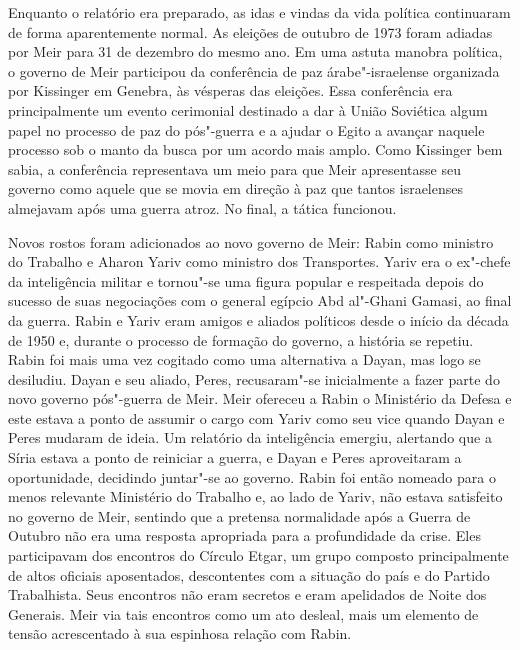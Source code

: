 
Enquanto o relatório era preparado, as idas e vindas da vida
política continuaram de forma aparentemente normal. As eleições de
outubro de 1973 foram adiadas por Meir para 31 de dezembro do mesmo ano.
Em uma astuta manobra política, o governo de Meir participou da
conferência de paz árabe"-israelense organizada por Kissinger em Genebra,
às vésperas das eleições. Essa conferência era principalmente
um evento cerimonial destinado a dar à União Soviética algum papel no
processo de paz do pós"-guerra e a ajudar o Egito a avançar naquele
processo sob o manto da busca por um acordo mais amplo. Como Kissinger
bem sabia, a conferência representava um meio para que Meir apresentasse
seu governo como aquele que se movia em direção à paz que tantos
israelenses almejavam após uma guerra atroz. No final, a tática
funcionou.

Novos rostos foram adicionados ao novo governo de Meir: Rabin como
ministro do Trabalho e Aharon Yariv como ministro dos Transportes.
Yariv era o ex"-chefe da inteligência militar e tornou"-se uma figura
popular e respeitada depois do sucesso de suas negociações com o general
egípcio Abd al"-Ghani Gamasi, ao final da guerra. Rabin e Yariv eram
amigos e aliados políticos desde o início da década de 1950 e, durante o
processo de formação do governo, a história se repetiu. Rabin foi mais
uma vez cogitado como uma alternativa a Dayan, mas logo se desiludiu.
Dayan e seu aliado, Peres, recusaram"-se inicialmente a fazer parte do
novo governo pós"-guerra de Meir. Meir ofereceu a Rabin o Ministério da
Defesa e este estava a ponto de assumir o cargo com Yariv como seu vice
quando Dayan e Peres mudaram de ideia. Um relatório da inteligência
emergiu, alertando que a Síria estava a ponto de reiniciar a guerra, e
Dayan e Peres aproveitaram a oportunidade, decidindo juntar"-se ao
governo. Rabin foi então nomeado para o menos relevante Ministério do
Trabalho e, ao lado de Yariv, não estava satisfeito no governo de Meir,
sentindo que a pretensa normalidade após a Guerra de Outubro não era uma
resposta apropriada para a profundidade da crise. Eles participavam dos
encontros do Círculo Etgar, um grupo composto principalmente de altos
oficiais aposentados, descontentes com a situação do país e do Partido
Trabalhista. Seus encontros não eram secretos e eram apelidados de Noite
dos Generais. Meir via tais encontros como um ato desleal, mais um
elemento de tensão acrescentado à sua espinhosa relação com Rabin.

